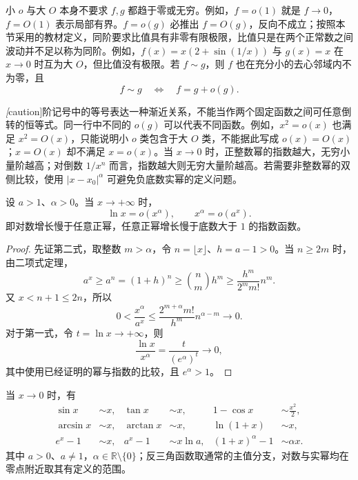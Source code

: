\documentclass[UTF8,12pt,a4paper,fontset=fandol]{ctexbook}
\begin{document}
小 $o$ 与大 $O$ 本身不要求 $f,g$ 都趋于零或无穷。例如，$f=o(1)$ 就是 $f\to0$，$f=O(1)$ 表示局部有界。$f=o(g)$ 必推出 $f=O(g)$，反向不成立；按照本节采用的教材定义，同阶要求比值具有非零有限极限，比值只是在两个正常数之间波动并不足以称为同阶。例如，$f(x)=x(2+\sin(1/x))$ 与 $g(x)=x$ 在 $x\to0$ 时互为大 $O$，但比值没有极限。若 $f\sim g$，则 $f$ 也在充分小的去心邻域内不为零，且
\begin{equation}
    f\sim g
    \quad\Longleftrightarrow\quad
    f=g+o(g).
    \label{eq:asymptotic-equivalence-remainder}
\end{equation}

\emph[caution]{阶记号中的等号表达一种渐近关系，不能当作两个固定函数之间可任意倒转的恒等式。}同一行中不同的 $o(g)$ 可以代表不同函数。例如，$x^2=o(x)$ 也满足 $x^2=O(x)$，只能说明小 $o$ 类包含于大 $O$ 类，不能据此写成 $o(x)=O(x)$；$x=O(x)$ 却不满足 $x=o(x)$。当 $x\to0$ 时，正整数幂的指数越大，无穷小量阶越高；对倒数 $1/x^n$ 而言，指数越大则无穷大量阶越高。若需要非整数幂的双侧比较，使用 $|x-x_0|^\alpha$ 可避免负底数实幂的定义问题。

\begin{proposition}[对数、幂与指数的增长次序]
\label{prop:logarithm-power-exponential-orders}
设 $a>1$、$\alpha>0$。当 $x\to+\infty$ 时，
\begin{equation}
    \ln x=o(x^\alpha),
    \qquad x^\alpha=o(a^x).
    \label{eq:logarithm-power-exponential-orders}
\end{equation}
即对数增长慢于任意正幂，任意正幂增长慢于底数大于 $1$ 的指数函数。
\end{proposition}

\begin{proof}
先证第二式，取整数 $m>\alpha$，令 $n=\lfloor x\rfloor$、$h=a-1>0$。当 $n\geq2m$ 时，由二项式定理，
\[
    a^x\geq a^n=(1+h)^n\geq\binom nm h^m
    \geq\frac{h^m}{2^m m!}n^m.
\]
又 $x<n+1\leq2n$，所以
\[
    0<\frac{x^\alpha}{a^x}
    \leq\frac{2^{m+\alpha}m!}{h^m}n^{\alpha-m}\to0.
\]
对于第一式，令 $t=\ln x\to+\infty$，则
\[
    \frac{\ln x}{x^\alpha}=\frac{t}{(e^\alpha)^t}\to0,
\]
其中使用已经证明的幂与指数的比较，且 $e^\alpha>1$。
\end{proof}

\begin{theorem}[常用等价无穷小]
\label{thm:standard-equivalent-infinitesimals}
当 $x\to0$ 时，有
\begin{equation}
    \begin{aligned}
        \sin x&\sim x,&\tan x&\sim x,&1-\cos x&\sim\frac{x^2}{2},\\
        \arcsin x&\sim x,&\arctan x&\sim x,&\ln(1+x)&\sim x,\\
        e^x-1&\sim x,&a^x-1&\sim x\ln a,&(1+x)^\alpha-1&\sim\alpha x.
    \end{aligned}
    \label{eq:standard-equivalent-infinitesimals}
\end{equation}
其中 $a>0$、$a\neq1$，$\alpha\in\mathbb{R}\setminus\{0\}$；反三角函数取通常的主值分支，对数与实幂均在零点附近取其有定义的范围。
\end{theorem}
\end{document}
